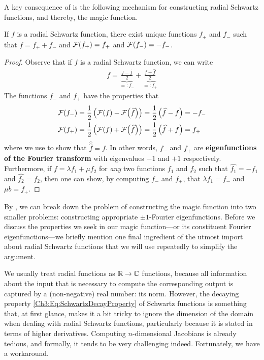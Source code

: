 A key consequence of  is the following mechanism for constructing radial Schwartz functions, and thereby, the magic function.

\begin{boxtheorem}\label{Ch3:Thm:RadialSchwartz_eq_unique_sum_pm1_eigfun}
    If $f$ is a radial Schwartz function, there exist unique functions $f_+$ and $f_-$ such that $f = f_+ + f_-$ and $\mathcal{F}\!\left( f_+ \right) = f_+$ and $\mathcal{F}\!\left( f_- \right) = -f_-$.
\end{boxtheorem}
\begin{proof}
    Observe that if $f$ is a radial Schwartz function, we can write
    \begin{align*}
        f = \underbrace{\frac{f - \hat{f}}{2}}_{=: f_{-}} + \underbrace{\frac{f + \hat{f}}{2}}_{=: f_{+}}
    \end{align*}
    The functions $f_{-}$ and $f_{+}$ have the properties that
    \begin{align*}
        \mathcal{F}\!\left( f_{-} \right) &= \frac{1}{2} \left( \mathcal{F}\!\left( f \right) - \mathcal{F}\!\left( \widehat{f} \right) \right) = \frac{1}{2} \left( \widehat{f} - f \right) = -f_{-} \\
        \mathcal{F}\!\left( f_{+} \right) &= \frac{1}{2} \left( \mathcal{F}\!\left( f \right) + \mathcal{F}\!\left( \widehat{f} \right) \right) = \frac{1}{2} \left( \widehat{f} + f \right) = f_{+}
    \end{align*}
    where we use  to show that $\hat{\hat{f}} = f$. In other words, $f_{-}$ and $f_{+}$ are \textbf{eigenfunctions of the Fourier transform} with eigenvalues $-1$ and $+1$ respectively. Furthermore, if $f = \lambda f_1 + \mu f_2$ for \textit{any} two functions $f_1$ and $f_2$ such that $\hat{f_1} = -f_1$ and $\hat{f_2} = f_2$, then one can show, by computing $f_{-}$ and $f_{+}$, that $\lambda f_1 = f_{-}$ and $\mu b = f_{+}$.
\end{proof}

By , we can break down the problem of constructing the magic function into two smaller problems: constructing appropriate $\pm 1$-Fourier eigenfunctions. Before we discuss the properties we seek in our magic function---or its constituent Fourier eigenfunctions---we briefly mention one final ingredient of the utmost import about radial Schwartz functions that we will use repeatedly to simplify the argument.

We usually treat radial functions as $\mathbb{R} \to \mathbb{C}$ functions, because all information about the input that is necessary to compute the corresponding output is captured by a (non-negative) real number: its norm. However, the decaying property \eqref{Ch3:Eq:SchwartzDecayProperty} of Schwartz functions is something that, at first glance, makes it a bit tricky to ignore the dimension of the domain when dealing with radial Schwartz functions, particularly because it is stated in terms of higher derivatives. Computing $n$-dimensional Jacobians is already tedious, and formally, it tends to be very challenging indeed. Fortunately, we have a workaround.

